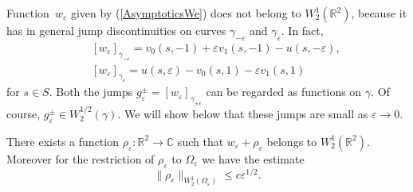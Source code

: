 \documentclass[graybox]{svmult}
\newcommand{\Real}{\mathbb R}
\newcommand{\Cmpl}{\mathbb C}
\newcommand{\eps}{\varepsilon}
\renewcommand{\leq}{\leqslant}
\newcommand{\eqref}[1]{(\ref{#1})}
\begin{document}
Function~$w_\eps$ given by \eqref{AsymptoticsWe} does not
belong to $W_2^1(\Real^2)$, because it has  in general  jump discontinuities on curves  $\gamma_{-\eps}$ and $\gamma_\eps$.
In fact,
\begin{eqnarray}\nonumber
&&[w_\eps]_{\gamma_{-\eps}}=v_0(s,-1)+\eps v_1(s,-1)-u(s,-\eps),\\
&&[w_\eps]_{\gamma_{\eps}}=u(s,\eps)-v_0(s,1)-\eps v_1(s,1)
\end{eqnarray}
for $s\in S$. Both the jumps $g_\eps^\pm=[w_\eps]_{\gamma_{\pm\eps}}$ can be regarded as  functions on $\gamma$. Of course, $g_\eps^\pm\in W_2^{1/2}(\gamma)$.
We will show below that these jumps are small as $\eps\to 0$.



\begin{proposition}\label{PropW21Corrector}
There exists a function $\rho_\eps\colon \Real^2\to \Cmpl$ such that $w_\eps+\rho_\eps$ belongs to $W_2^1(\Real^2)$. Moreover for the restriction of $\rho_\eps$ to $\Omega_\eps$  we have the estimate
\begin{equation}\label{EstRhoEps}
\|\rho_\eps\|_{W_2^1(\Omega_\eps)}\leq c \eps^{1/2}.
\end{equation}
\end{proposition}
\end{document}
